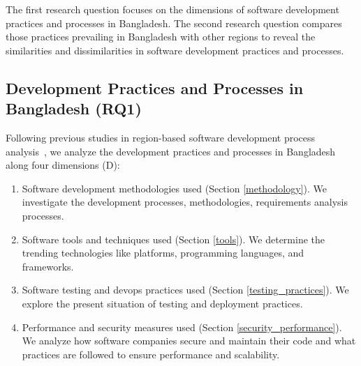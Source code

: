 The first research question focuses on the dimensions of software development
practices and processes in Bangladesh. The second research question compares those
practices prevailing in Bangladesh with other regions to reveal the similarities
and dissimilarities in software development practices and processes.

\subsection{Development Practices and Processes in Bangladesh (RQ1)}
\label{RQ1}
Following previous studies in region-based software development process analysis~\citep{Garousi2013, Garousi2015, Vonken2012, Wang2018}, we 
analyze the development practices and processes in Bangladesh along four dimensions (D):
\begin{enumerate}[label=D\arabic{*}., leftmargin=20pt]
  \item Software development methodologies used (Section \ref{methodology}). We investigate the development
processes, methodologies, requirements analysis processes.
  \item Software tools and techniques used (Section \ref{tools}). We determine the
trending technologies like platforms, programming languages, and frameworks.
\item Software testing and devops practices used (Section \ref{testing_practices}). We explore the
present situation of testing and deployment practices.
\item Performance and security measures used (Section \ref{security_performance}). We analyze how
software companies secure and maintain their code and what practices are
followed to ensure performance and scalability.
\end{enumerate}






